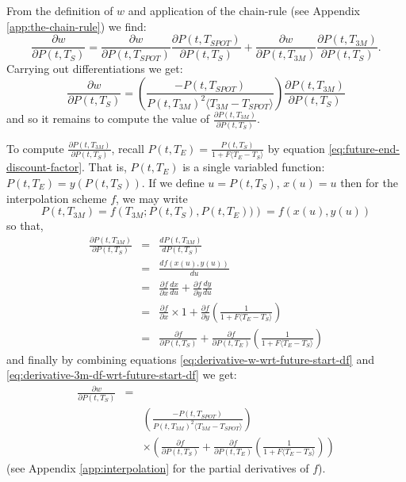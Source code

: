\documentclass[a4paper]{article}
\begin{document}
From the definition of $w$ and application of the chain-rule (see Appendix \ref{app:the-chain-rule}) we find:
\[
\frac{\partial{w}}{\partial{P(t, T_{S})}}
  = \frac{\partial{w}}{\partial{P(t, T_{SPOT})}}\frac{\partial{P(t, T_{SPOT})}}{\partial{P(t, T_{S})}} 
  +\frac{\partial{w}}{\partial{P(t, T_{3M})}}\frac{\partial{P(t, T_{3M})}}{\partial{P(t, T_{S})}}.
\] Carrying out differentiations we get:
\begin{equation}
  \frac{\partial{w}}{\partial{P(t, T_{S})}} = 
  \left(\frac{-P(t, T_{SPOT})}{P(t, T_{3M})^{2}\langle T_{3M}-T_{SPOT}\rangle}\right)
  \frac{\partial{P(t, T_{3M})}}{\partial{P(t, T_{S})}} \label{eq:derivative-w-wrt-future-start-df}
\end{equation} and so it remains to compute the value of $\frac{\partial{P(t, T_{3M})}}{\partial{P(t, T_{S})}}$.

To compute $\frac{\partial{P(t, T_{3M})}}{\partial{P(t, T_{S})}}$, recall $P(t, T_{E}) = \frac{P(t, T_{S})}{1+F\langle T_{E}-T_{S}\rangle}$ by equation \ref{eq:future-end-discount-factor}. That is, $P(t, T_{E})$ is a single variabled function: $P(t, T_{E}) = y\left(P(t, T_{S})\right)$. If we define $u = P(t, T_{S})$, $x(u) = u$ then for the interpolation scheme $f$, we may write \
\[
  P(t, T_{3M}) = f\left(T_{3M}; P(t, T_{S}), P(t, T_{E}))\right) = f(x(u), y(u))
\] so that,
\begin{eqnarray}
\frac{\partial{P(t, T_{3M})}}{\partial{P(t, T_{S})}} 
   & = & \frac{dP(t, T_{3M})}{dP(t, T_{S})}  \nonumber \\
   & = & \frac{df(x(u),y(u))}{du} \nonumber \\
   & = & \frac{\partial{f}}{\partial{x}}\frac{dx}{du}+\frac{\partial{f}}{\partial{y}}\frac{dy}{du} \nonumber \\
   & = & \frac{\partial{f}}{\partial{x}}\times{1} + \frac{\partial{f}}{\partial{y}}\left(\frac{1}{1+F\langle T_{E}-T_{S}\rangle}\right) \nonumber \\
   & = & \frac{\partial{f}}{\partial{P(t, T_{S})}}+\frac{\partial{f}}{\partial{P(t, T_{E})}}\left(\frac{1}{1+F\langle T_{E}-T_{S}\rangle}\right) 
   \label{eq:derivative-3m-df-wrt-future-start-df}
\end{eqnarray} and finally by combining equations \ref{eq:derivative-w-wrt-future-start-df} and \ref{eq:derivative-3m-df-wrt-future-start-df} we get:
\begin{eqnarray}
\frac{\partial{w}}{\partial{P(t, T_{S})}} & = & \nonumber \\
& & \left(\frac{-P(t, T_{SPOT})}{P(t, T_{3M})^{2}\langle T_{3M}-T_{SPOT}\rangle}\right) \nonumber \\
& & \times{\left(\frac{\partial{f}}{\partial{P(t, T_{S})}}+\frac{\partial{f}}{\partial{P(t, T_{E})}}(\frac{1}{1+F\langle T_{E}-T_{S}\rangle})\right)}
\end{eqnarray} (see Appendix \ref{app:interpolation} for the partial derivatives of $f$).
\end{document}
